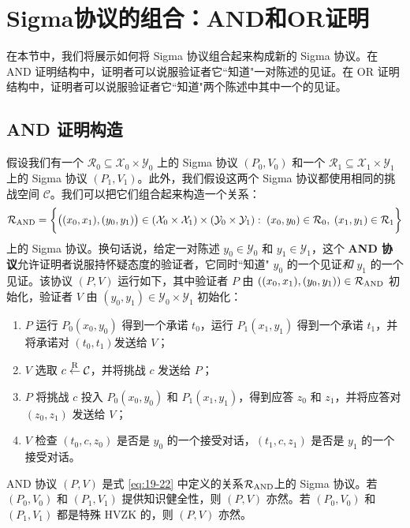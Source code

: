 \section{Sigma协议的组合：AND和OR证明}

在本节中，我们将展示如何将 Sigma 协议组合起来构成新的 Sigma 协议。在 AND 证明结构中，证明者可以说服验证者它``知道"一对陈述的见证。在 OR 证明结构中，证明者可以说服验证者它``知道"两个陈述中其中一个的见证。

\subsection{AND 证明构造}

假设我们有一个 $\mathcal{R}_0\subseteq\mathcal{X}_0\times\mathcal{Y}_0$ 上的 Sigma 协议 $(P_0,V_0)$ 和一个 $\mathcal{R}_1\subseteq\mathcal{X}_1\times\mathcal{Y}_1$ 上的 Sigma 协议 $(P_1,V_1)$。此外，我们假设这两个 Sigma 协议都使用相同的挑战空间 $\mathcal{C}$。我们可以把它们组合起来构造一个关系：
\begin{equation}\label{eq:19-22}
\mathcal{R}_{\rm AND}=
\bigg\lbrace
\big((x_0,x_1),(y_0,y_1)\big)\in\left(\mathcal{X}_0\times\mathcal{X}_1\right)\times\left(\mathcal{Y}_0\times\mathcal{Y}_1\right):
\;
(x_0,y_0)\in\mathcal{R}_0,
\;
(x_1,y_1)\in\mathcal{R}_1
\bigg\rbrace
\end{equation}
上的 Sigma 协议。换句话说，给定一对陈述 $y_0\in\mathcal{Y}_0$ 和 $y_1\in\mathcal{Y}_1$，这个 \textbf{AND 协议}允许证明者说服持怀疑态度的验证者，它同时``知道" $y_0$ 的一个见证\emph{和} $y_1$ 的一个见证。该协议 $(P,V)$ 运行如下，其中验证者 $P$ 由 $((x_0,x_1),(y_0,y_1))\in\mathcal{R}_{\rm AND}$ 初始化，验证者 $V$ 由 $(y_0,y_1)\in\mathcal{Y}_0\times\mathcal{Y}_1$ 初始化：
\begin{enumerate}
	\item $P$ 运行 $P_0(x_0,y_0)$ 得到一个承诺 $t_0$，运行 $P_1(x_1,y_1)$ 得到一个承诺 $t_1$，并将承诺对 $(t_0,t_1)$发送给 $V$；
	\item $V$ 选取 $c\overset{\rm R}\leftarrow\mathcal{C}$，并将挑战 $c$ 发送给 $P$；
	\item $P$ 将挑战 $c$ 投入 $P_0(x_0,y_0)$ 和 $P_1(x_1,y_1)$，得到应答 $z_0$ 和 $z_1$，并将应答对 $(z_0,z_1)$ 发送给 $V$；
	\item $V$ 检查 $(t_0,c,z_0)$ 是否是 $y_0$ 的一个接受对话，$(t_1,c,z_1)$ 是否是 $y_1$ 的一个接受对话。
\end{enumerate}

\begin{theorem}
AND 协议 $(P,V)$ 是式 \ref{eq:19-22} 中定义的关系$\mathcal{R}_{\rm AND}$上的 Sigma 协议。若 $(P_0,V_0)$ 和 $(P_1,V_1)$ 提供知识健全性，则 $(P, V)$ 亦然。若 $(P_0,V_0)$ 和 $(P_1,V_1)$ 都是特殊 HVZK 的，则 $(P,V)$ 亦然。
\end{theorem}

